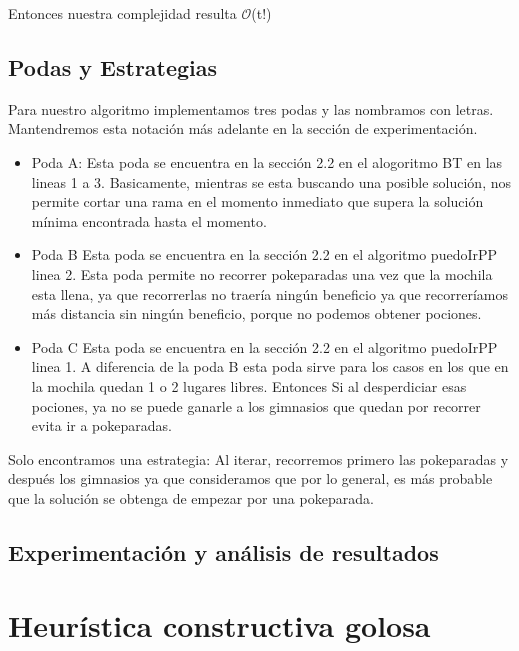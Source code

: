 \documentclass[spanish,12pt]{article}
\begin{document}
Entonces nuestra complejidad resulta $ \mathcal{O}$(t!)  

\subsection{Podas y Estrategias}
Para nuestro algoritmo implementamos tres podas y las nombramos con letras. Mantendremos esta notación más adelante en la sección de experimentación.
\begin{itemize}
	\item Poda A:
Esta poda se encuentra en la sección 2.2 en el alogoritmo BT en las lineas 1 a 3.
Basicamente, mientras se esta buscando una posible solución, nos permite cortar una rama en el momento inmediato que supera la solución mínima encontrada hasta el momento. 

	\item Poda B
Esta poda se encuentra en la sección 2.2 en el algoritmo puedoIrPP linea 2. 
Esta poda permite no recorrer pokeparadas una vez que la mochila esta llena, ya que recorrerlas no traería ningún beneficio ya que recorreríamos más distancia sin ningún beneficio, porque no podemos obtener pociones.

	\item Poda C
Esta poda se encuentra en la sección 2.2 en el algoritmo puedoIrPP linea 1. 
A diferencia de la poda B esta poda sirve para los casos en los que en la mochila quedan 1 o 2 lugares libres. Entonces Si al desperdiciar esas pociones, ya no se puede ganarle a los gimnasios que quedan por recorrer evita ir a pokeparadas.

\end{itemize}

Solo encontramos una estrategia:
Al iterar, recorremos primero las pokeparadas y después los gimnasios ya que consideramos que por lo general, es más probable que la solución se obtenga de empezar por una pokeparada.  



\subsection{Experimentación y análisis de resultados}



\section{Heurística constructiva golosa}
\end{document}
